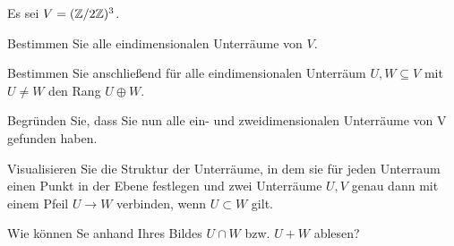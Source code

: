 \begin{Problem}
	Es sei $V=(\mathbb{Z} / 2\mathbb{Z})^3$.
	\begin{parts}
	\item Bestimmen Sie alle eindimensionalen Unterräume von $V$.
	\item Bestimmen Sie anschließend für alle eindimensionalen Unterräum $U,W\subseteq V$ mit $U\neq W$ den Rang $U\oplus W$. 
	\item Begründen Sie, dass Sie nun alle ein- und zweidimensionalen Unterräume von V gefunden haben.
	\item Visualisieren Sie die Struktur der Unterräume, in dem sie für jeden Unterraum einen Punkt in der Ebene festlegen und zwei Unterräume $U,V$ genau dann mit einem Pfeil $U\to W$ verbinden, wenn $U\subset W$ gilt.
	\item Wie können Se anhand Ihres Bildes $U\cap W$ bzw. $U+W$ ablesen?
	\end{parts}
\end{Problem}
